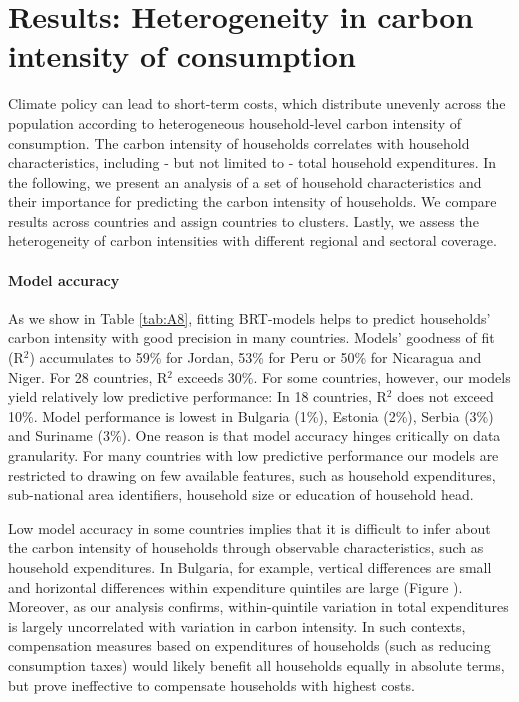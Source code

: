 \documentclass[12pt, a4paper]{article}
\begin{document}
\section{Results: Heterogeneity in carbon intensity of consumption} \label{sec:results}

Climate policy can lead to short-term costs, which distribute unevenly across the population according to heterogeneous household-level carbon intensity of consumption. The carbon intensity of households correlates with household characteristics, including - but not limited to - total household expenditures. In the following, we present an analysis of a set of household characteristics and their importance for predicting the carbon intensity of households. We compare results across countries and assign countries to clusters. Lastly, we assess the heterogeneity of carbon intensities with different regional and sectoral coverage.

\paragraph{Model accuracy} 
As we show in Table \ref{tab:A8}, fitting BRT-models helps to predict households' carbon intensity with good precision in many countries. Models' goodness of fit (R$^{2}$) accumulates to 59\% for Jordan, 53\% for Peru or 50\% for Nicaragua and Niger. For 28 countries, R$^{2}$ exceeds 30\%. For some countries, however, our models yield relatively low predictive performance: In 18 countries, R$^{2}$ does not exceed 10\%. Model performance is lowest in Bulgaria (1\%), Estonia (2\%), Serbia (3\%) and Suriname (3\%). One reason is that model accuracy hinges critically on data granularity. For many countries with low predictive performance our models are restricted to drawing on few available features, such as household expenditures, sub-national area identifiers, household size or education of household head.

Low model accuracy in some countries implies that it is difficult to infer about the carbon intensity of households through observable characteristics, such as household expenditures. In Bulgaria, for example, vertical differences are small and horizontal differences within expenditure quintiles are large (Figure ). Moreover, as our analysis confirms, within-quintile variation in total expenditures is largely uncorrelated with variation in carbon intensity. In such contexts, compensation measures based on expenditures of households (such as reducing consumption taxes) would likely benefit all households equally in absolute terms, but prove ineffective to compensate households with highest costs. 
\end{document}
